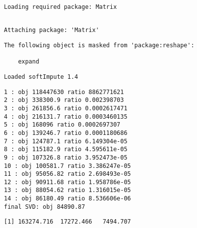 \documentclass[12pt,twoside]{dukestatscithesis}
\theoremstyle{definition}
\theoremstyle{definition}
\theoremstyle{definition}
\theoremstyle{remark}
\begin{document}
\begin{verbatim}
Loading required package: Matrix
\end{verbatim}
\begin{verbatim}

Attaching package: 'Matrix'
\end{verbatim}
\begin{verbatim}
The following object is masked from 'package:reshape':

    expand
\end{verbatim}
\begin{verbatim}
Loaded softImpute 1.4
\end{verbatim}
\begin{Shaded}
\begin{Highlighting}[]
\StringTok{ }\NormalTok{,}\NormalTok{,}\NormalTok{,}\NormalTok{)}
\end{Highlighting}
\end{Shaded}
\begin{verbatim}
1 : obj 118447630 ratio 8862771621 
2 : obj 338300.9 ratio 0.002398703 
3 : obj 261856.6 ratio 0.0002617471 
4 : obj 216131.7 ratio 0.0003460135 
5 : obj 168096 ratio 0.0002697307 
6 : obj 139246.7 ratio 0.0001180686 
7 : obj 124787.1 ratio 6.149304e-05 
8 : obj 115182.9 ratio 4.595611e-05 
9 : obj 107326.8 ratio 3.952473e-05 
10 : obj 100581.7 ratio 3.386247e-05 
11 : obj 95056.82 ratio 2.698493e-05 
12 : obj 90911.68 ratio 1.958786e-05 
13 : obj 88054.62 ratio 1.316015e-05 
14 : obj 86180.49 ratio 8.536606e-06 
final SVD: obj 84890.87 
\end{verbatim}
\begin{Shaded}
\begin{Highlighting}[]
\end{Highlighting}
\end{Shaded}
\begin{verbatim}
[1] 163274.716  17272.466   7494.707
\end{verbatim}
\begin{Shaded}
\begin{Highlighting}[]
\StringTok{ }
\NormalTok{(ports_mean_matrix[!}\NormalTok{(ports_mean_matrix)], filled[!}\NormalTok{(ports_mean_matrix)])}
\end{Highlighting}
\end{Shaded}
\end{document}

